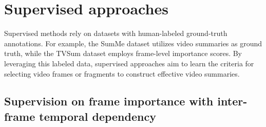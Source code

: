 \section{Supervised approaches} 
\label{section:rel-supervised}
Supervised methods rely on datasets with human-labeled ground-truth annotations. For example, the SumMe dataset \cite{Gygli2014SumMe} utilizes video summaries as ground truth, while the TVSum dataset \cite{Song2015TVSum} employs frame-level importance scores. By leveraging this labeled data, supervised approaches aim to learn the criteria for selecting video frames or fragments to construct effective video summaries.

\subsection{Supervision on frame importance with inter-frame temporal dependency}
\label{subsec:rel-sup-temporal-dependency}



